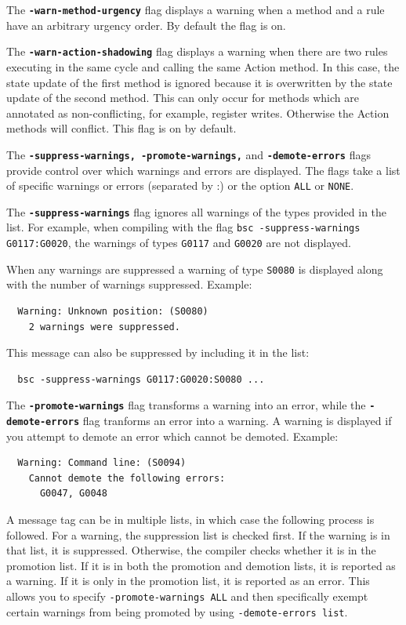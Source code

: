 \documentclass{article}
\newcommand{\te}[1]{\texttt{#1}}
\begin{document}
The {\bf\tt -warn-method-urgency} flag displays a warning when a
method and a rule have an arbitrary urgency order.  By default the
flag is on.

The {\bf\tt -warn-action-shadowing} flag displays a warning when there
are two rules  executing in the same cycle and calling the same Action
method.  In this case,  the state update of the first method is ignored because it is
overwritten by the state update of the second method.  This can only
occur for methods  which are annotated as non-conflicting, for
example,  register writes.  Otherwise the Action methods will
conflict. This flag is on by default.

The {\bf\tt -suppress-warnings, -promote-warnings,} and {\bf\tt -demote-errors} flags provide control over which
warnings and errors are displayed.  The flags take a list of specific  warnings
or errors  (separated by :) or  the option
\te{ALL} or \te{NONE}.

The {\bf\tt -suppress-warnings} flag
ignores all warnings of the types provided in the list.  
For example, when compiling with the flag \te{bsc -suppress-warnings
G0117:G0020},  the warnings  of types \te{G0117} and \te{G0020} 
are not  displayed.  

When any warnings are suppressed a warning of type \te{S0080} is
displayed along with the number of warnings suppressed.  Example:

\begin{verbatim}
  Warning: Unknown position: (S0080)
    2 warnings were suppressed.
\end{verbatim}

This message can also be suppressed by including it in the list:

\begin{verbatim}
  bsc -suppress-warnings G0117:G0020:S0080 ...
\end{verbatim}

The {\bf\tt -promote-warnings} flag transforms a warning into an
error, while the {\bf\tt -demote-errors} flag tranforms an error into
a warning.   A warning is displayed if you attempt to demote an error
which cannot be demoted.  Example:

\begin{verbatim}
  Warning: Command line: (S0094)
    Cannot demote the following errors:
      G0047, G0048 
\end{verbatim}

A message tag can be in multiple lists, in which case the following
process is followed.  For a warning, the suppression list is checked
first.  If the warning is in that list, it is suppressed.  Otherwise,
the compiler checks whether it is in the promotion list.  If it
is in both the promotion and demotion lists, it is reported as a
warning.  If it is only in the promotion list, it is reported as an
error.  This allows you to specify \te{-promote-warnings ALL} and then
specifically exempt certain warnings from being promoted by using
\te{-demote-errors list}.
\end{document}
